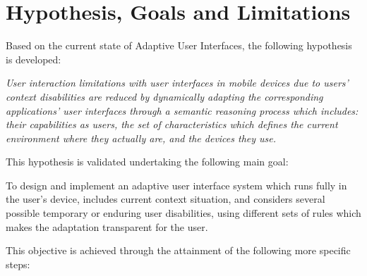\section{Hypothesis, Goals and Limitations}
\label{sec:hypothesis}
Based on the current state of Adaptive User Interfaces, the following hypothesis
is developed:
 
\begin{framed}
\textit{User interaction limitations with user interfaces in mobile devices due 
to users' context disabilities are reduced by dynamically adapting the 
corresponding applications' user interfaces through a semantic reasoning process 
which includes: their capabilities as users, the set of characteristics which 
defines the current environment where they actually are, and the devices they 
use. }
\end{framed}

This hypothesis is validated undertaking the following main goal:

\begin{framed}
 To design and implement an adaptive user interface system which runs fully in
 the user's device, includes current context situation, and considers several
 possible temporary or enduring user disabilities, using different sets of rules
 which makes the adaptation transparent for the user.
\end{framed}


This objective is achieved through the attainment of the following more specific
steps:

